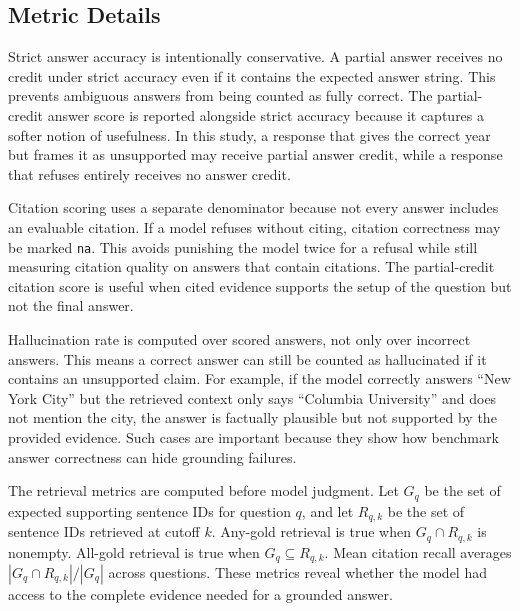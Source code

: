 \documentclass[10pt,twocolumn]{article}
\begin{document}
\subsection{Metric Details}

Strict answer accuracy is intentionally conservative. A partial answer receives no credit under strict accuracy even if it contains the expected answer string. This prevents ambiguous answers from being counted as fully correct. The partial-credit answer score is reported alongside strict accuracy because it captures a softer notion of usefulness. In this study, a response that gives the correct year but frames it as unsupported may receive partial answer credit, while a response that refuses entirely receives no answer credit.

Citation scoring uses a separate denominator because not every answer includes an evaluable citation. If a model refuses without citing, citation correctness may be marked \texttt{na}. This avoids punishing the model twice for a refusal while still measuring citation quality on answers that contain citations. The partial-credit citation score is useful when cited evidence supports the setup of the question but not the final answer.

Hallucination rate is computed over scored answers, not only over incorrect answers. This means a correct answer can still be counted as hallucinated if it contains an unsupported claim. For example, if the model correctly answers ``New York City'' but the retrieved context only says ``Columbia University'' and does not mention the city, the answer is factually plausible but not supported by the provided evidence. Such cases are important because they show how benchmark answer correctness can hide grounding failures.

The retrieval metrics are computed before model judgment. Let \(G_q\) be the set of expected supporting sentence IDs for question \(q\), and let \(R_{q,k}\) be the set of sentence IDs retrieved at cutoff \(k\). Any-gold retrieval is true when \(G_q \cap R_{q,k}\) is nonempty. All-gold retrieval is true when \(G_q \subseteq R_{q,k}\). Mean citation recall averages \(|G_q \cap R_{q,k}| / |G_q|\) across questions. These metrics reveal whether the model had access to the complete evidence needed for a grounded answer.
\end{document}
